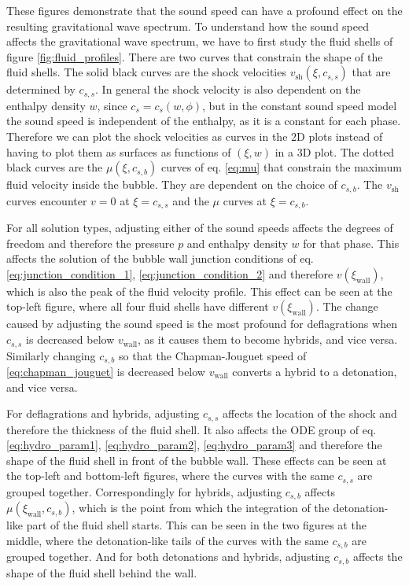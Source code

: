 These figures demonstrate that the sound speed can have a profound effect on the resulting gravitational wave spectrum.
To understand how the sound speed affects the gravitational wave spectrum,
we have to first study the fluid shells of figure \ref{fig:fluid_profiles}.
There are two curves that constrain the shape of the fluid shells.
The solid black curves are the shock velocities $v_\text{sh}(\xi,c_{s,s})$ that are determined by $c_{s,s}$.
In general the shock velocity is also dependent on the enthalpy density $w$, since $c_s = c_s(w,\phi)$,
but in the constant sound speed model the sound speed is independent of the enthalpy,
as it is a constant for each phase.
Therefore we can plot the shock velocities as curves in the 2D plots instead of having to plot them as surfaces as functions of $(\xi,w)$ in a 3D plot.
The dotted black curves are the $\mu(\xi,c_{s,b})$ curves of eq. \eqref{eq:mu} that constrain the maximum fluid velocity inside the bubble.
They are dependent on the choice of $c_{s,b}$.
The $v_\text{sh}$ curves encounter $v=0$ at $\xi = c_{s,s}$ and the $\mu$ curves at $\xi = c_{s,b}$.

For all solution types, adjusting either of the sound speeds affects the degrees of freedom and therefore the pressure $p$ and enthalpy density $w$ for that phase.
This affects the solution of the bubble wall junction conditions of eq. \eqref{eq:junction_condition_1}, \eqref{eq:junction_condition_2} and therefore $v(\xi_\text{wall})$,
which is also the peak of the fluid velocity profile.
This effect can be seen at the top-left figure, where all four fluid shells have different $v(\xi_\text{wall})$.
The change caused by adjusting the sound speed is the most profound for deflagrations when $c_{s,s}$ is decreased below $v_\text{wall}$, as it causes them to become hybrids, and vice versa.
Similarly changing $c_{s,b}$ so that the Chapman-Jouguet speed of \eqref{eq:chapman_jouguet} is decreased below $v_\text{wall}$ converts a hybrid to a detonation, and vice versa.

For deflagrations and hybrids, adjusting $c_{s,s}$ affects the location of the shock and therefore the thickness of the fluid shell.
It also affects the ODE group of eq. \eqref{eq:hydro_param1}, \eqref{eq:hydro_param2}, \eqref{eq:hydro_param3} and therefore the shape of the fluid shell in front of the bubble wall.
These effects can be seen at the top-left and bottom-left figures, where the curves with the same $c_{s,s}$ are grouped together.
Correspondingly for hybrids, adjusting $c_{s,b}$ affects $\mu(\xi_\text{wall},c_{s,b})$,
which is the point from which the integration of the detonation-like part of the fluid shell starts.
This can be seen in the two figures at the middle, where the detonation-like tails of the curves with the same $c_{s,b}$ are grouped together.
And for both detonations and hybrids, adjusting $c_{s,b}$ affects the shape of the fluid shell behind the wall.

